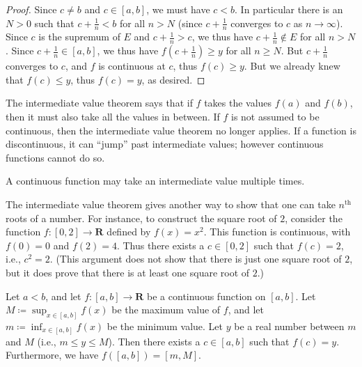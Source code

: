 \begin{proof}
    Since \(c \neq b\) and \(c \in [a, b]\), we must have \(c < b\).
    In particular there is an \(N > 0\) such that \(c + \frac{1}{n} < b\) for all \(n > N\)
    (since \(c + \frac{1}{n}\) converges to \(c\) as \(n \to \infty\)).
    Since \(c\) is the supremum of \(E\) and \(c + \frac{1}{n} > c\), we thus have \(c + \frac{1}{n} \notin E\) for all \(n > N\).
    Since \(c + \frac{1}{n} \in [a, b]\), we thus have \(f(c + \frac{1}{n}) \geq y\) for all \(n \geq N\).
    But \(c + \frac{1}{n}\) converges to \(c\), and \(f\) is continuous at \(c\), thus \(f(c) \geq y\).
    But we already knew that \(f(c) \leq y\), thus \(f(c) = y\), as desired.
\end{proof}

\begin{note}
    The intermediate value theorem says that if \(f\) takes the values \(f(a)\) and \(f(b)\), then it must also take all the values in between.
    If \(f\) is not assumed to be continuous, then the intermediate value theorem no longer applies.
    If a function is discontinuous, it can ``jump'' past intermediate values;
    however continuous functions cannot do so.
\end{note}

\begin{remark}\label{9.7.2}
    A continuous function may take an intermediate value multiple times.
\end{remark}

\begin{remark}\label{9.7.3}
    The intermediate value theorem gives another way to show that one can take \(n^{\text{th}}\) roots of a number.
    For instance, to construct the square root of \(2\), consider the function \(f : [0, 2] \to \mathbf{R}\) defined by \(f(x) = x^2\).
    This function is continuous, with \(f(0) = 0\) and \(f(2) = 4\).
    Thus there exists a \(c \in [0, 2]\) such that \(f(c) = 2\), i.e., \(c^2 = 2\).
    (This argument does not show that there is just one square root of \(2\), but it does prove that there is at least one square root of \(2\).)
\end{remark}

\begin{corollary}\label{9.7.4}
    Let \(a < b\), and let \(f : [a, b] \to \mathbf{R}\) be a continuous function on \([a, b]\).
    Let \(M \coloneqq \sup_{x \in [a, b]} f(x)\) be the maximum value of \(f\), and let \(m \coloneqq \inf_{x \in [a, b]} f(x)\) be the minimum value.
    Let \(y\) be a real number between \(m\) and \(M\) (i.e., \(m \leq y \leq M\)).
    Then there exists a \(c \in [a, b]\) such that \(f(c) = y\).
    Furthermore, we have \(f([a, b]) = [m, M]\).
\end{corollary}

